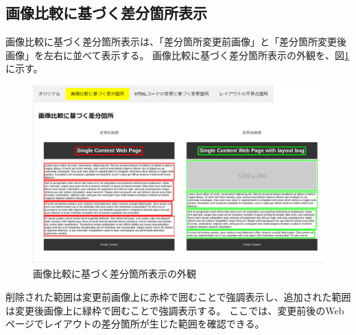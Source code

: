 \subsection{画像比較に基づく差分箇所表示}\label{subsec:images_tab}
画像比較に基づく差分箇所表示は、「差分箇所変更前画像」と「差分箇所変更後画像」を左右に並べて表示する。
画像比較に基づく差分箇所表示の外観を、図\ref{fig: Appearance_images_tab}に示す。
\begin{figure}[tp]
    \begin{center}
        \includegraphics[width=1.0\columnwidth]{image/new_img.png}
        \caption{画像比較に基づく差分箇所表示の外観}
        \label{fig: Appearance_images_tab}
    \end{center}
\end{figure}
削除された範囲は変更前画像上に赤枠で囲むことで強調表示し、追加された範囲は変更後画像上に緑枠で囲むことで強調表示する。
ここでは、変更前後のWebページでレイアウトの差分箇所が生じた範囲を確認できる。

